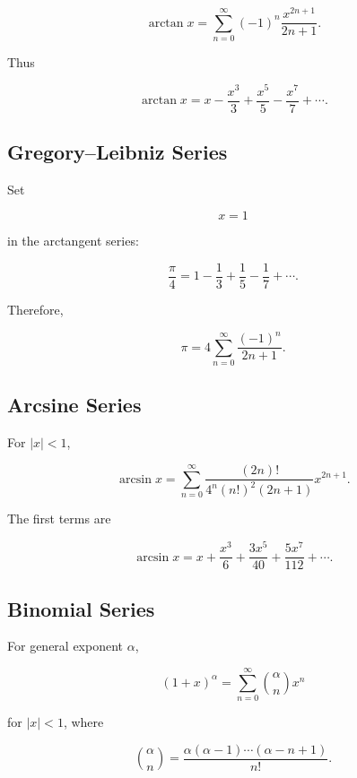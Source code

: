 \[
\boxed{
\arctan x
=
\sum_{n=0}^{\infty}
(-1)^n
\frac{
x^{2n+1}
}{
2n+1
}.
}
\]

Thus

\[
\boxed{
\arctan x
=
x-\frac{x^3}{3}
+\frac{x^5}{5}
-\frac{x^7}{7}
+\cdots.
}
\]

\subsection{Gregory--Leibniz Series}
\label{subsec:gregory-leibniz-series-reference}

Set

\[
x=1
\]

in the arctangent series:

\[
\frac{\pi}{4}
=
1-\frac13+\frac15-\frac17+\cdots.
\]

Therefore,

\[
\boxed{
\pi
=
4
\sum_{n=0}^{\infty}
\frac{
(-1)^n
}{
2n+1
}.
}
\]

\subsection{Arcsine Series}
\label{subsec:arcsine-series-reference}

For \(|x|<1\),

\[
\boxed{
\arcsin x
=
\sum_{n=0}^{\infty}
\frac{
(2n)!
}{
4^n(n!)^2(2n+1)
}
x^{2n+1}.
}
\]

The first terms are

\[
\boxed{
\arcsin x
=
x
+
\frac{x^3}{6}
+
\frac{3x^5}{40}
+
\frac{5x^7}{112}
+\cdots.
}
\]

\subsection{Binomial Series}
\label{subsec:binomial-series-reference}

For general exponent \(\alpha\),

\[
\boxed{
(1+x)^\alpha
=
\sum_{n=0}^{\infty}
\binom{\alpha}{n}
x^n
}
\]

for \(|x|<1\), where

\[
\boxed{
\binom{\alpha}{n}
=
\frac{
\alpha(\alpha-1)\cdots(\alpha-n+1)
}{
n!
}.
}
\]

